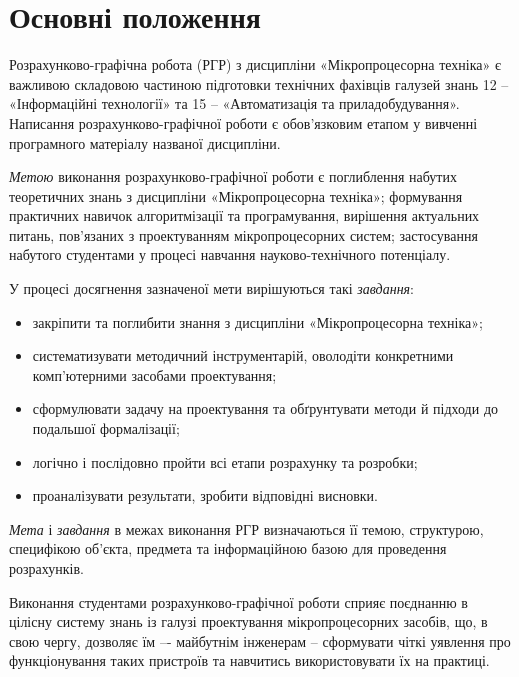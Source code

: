 \chapter{Основні положення}
Розрахунково-графічна робота (РГР) з дис\-цип\-ліни «Мікропроцесорна техніка» є важливою складовою частиною підготовки технічних фахівців галузей знань 12 -- «Інформаційні технології» та 15 -- «Автоматизація та приладобудування». Написання розрахунково-графічної роботи є обов’язковим етапом у вивченні програмного матеріалу названої дисципліни.

\textit{Метою} виконання розрахунково-графічної роботи є поглиблення набутих теоретичних знань з дисципліни «Мікропроцесорна техніка»; формування практичних навичок алгоритмізації та програмування, вирішення актуальних питань, пов’язаних з проектуванням мікропроцесорних систем; застосування набутого студентами у процесі навчання науково-технічного потенціалу.

У процесі досягнення зазначеної мети вирішуються такі \textit{завдання}:
\begin{itemize}
\item закріпити та поглибити знання з дисципліни «Мікропроцесорна техніка»;
\item систематизувати методичний інструментарій, оволодіти кон\-крет\-ни\-ми комп'ютерними засобами проектування;
\item сформулювати задачу на проектування та обґрунтувати методи й підходи до подальшої формалізації;
\item логічно і послідовно пройти всі етапи розрахунку та розробки;
\item проаналізувати результати, зробити відповідні вис\-нов\-ки.
\end{itemize}

\textit{Мета} і \textit{завдання} в межах виконання РГР визначаються її темою, структурою, специфікою об’єкта, предмета та інформаційною базою для проведення розрахунків.

Виконання студентами розрахунково-графічної роботи сприяє поєднанню в цілісну систему знань із галузі проектування мікропроцесорних засобів, що, в свою чергу, дозволяє їм –- майбутнім інженерам -- сформувати чіткі уявлення про функціонування таких пристроїв та навчитись використовувати їх на практиці.


